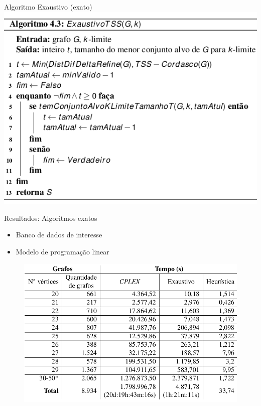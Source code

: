 \documentclass{beamer}
\begin{document}
\begin{frame}{Algoritmo Exaustivo (exato)}
\includegraphics[scale=0.4]{img/algo-exaustivo.png}
\end{frame}

\begin{frame}{Resultados: Algoritmos exatos}
\begin{itemize}
\tightlist
\item
  Banco de dados de interesse
\item
  Modelo de programação linear
\end{itemize}

\begin{figure}
\centering
\includegraphics[scale=0.3]{img/comparativo-exato.png}
\end{figure}
\end{frame}
\end{document}
